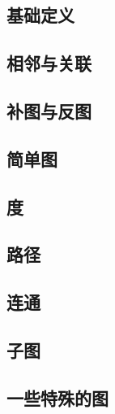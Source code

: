 \subsection{基础定义}
\label{gtbasic:ssec:def}



\subsection{相邻与关联}
\label{gtbasic:ssec:adj}



\subsection{补图与反图}
\label{gtbasic:ssec:comp}



\subsection{简单图}
\label{gtbasic:ssec:simpg}

\questions


\subsection{度}
\label{gtbasic:ssec:degree}



\subsection{路径}
\label{gtbasic:ssec:path}



\subsection{连通}
\label{gtbasic:ssec:connection}



\subsection{子图}
\label{gtbasic:ssec:subgraph}

\questions


\subsection{一些特殊的图}
\label{gtbasic:ssec:example}

